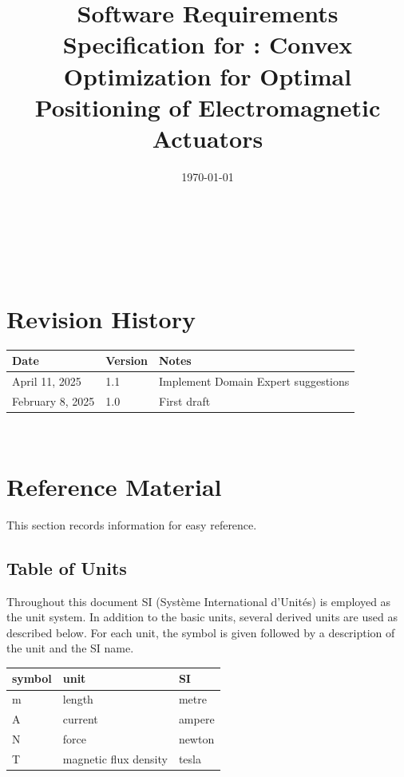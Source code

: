 \documentclass[12pt]{article}
\begin{document}
\title{Software Requirements Specification for \progname: Convex Optimization for Optimal Positioning of Electromagnetic Actuators} 
\author{\authname}
\date{\today}
	
\maketitle

~\newpage


\tableofcontents

~\newpage

\section*{Revision History}

\begin{tabularx}{\textwidth}{p{3cm}p{2cm}X}
\toprule {\bf Date} & {\bf Version} & {\bf Notes}\\
\midrule
April 11, 2025 & 1.1 & Implement Domain Expert suggestions \\
\midrule
February 8, 2025 & 1.0 & First draft\\
\bottomrule
\end{tabularx}


~\newpage

\section{Reference Material}

This section records information for easy reference.

\subsection{Table of Units}

Throughout this document SI (Syst\`{e}me International d'Unit\'{e}s) is employed
as the unit system.  In addition to the basic units, several derived units are
used as described below.  For each unit, the symbol is given followed by a
description of the unit and the SI name.
~\newline

\renewcommand{\arraystretch}{1.2}
  \noindent \begin{tabular}{l l l} 
    \toprule		
    \textbf{symbol} & \textbf{unit} & \textbf{SI}\\
    \midrule 
    \si{\metre} & length & metre\\
    \si{\ampere} & current & ampere\\
    \si{\newton} & force & newton\\
    \si{\tesla} & magnetic flux density & tesla\\
    \bottomrule
  \end{tabular}
\end{document}
